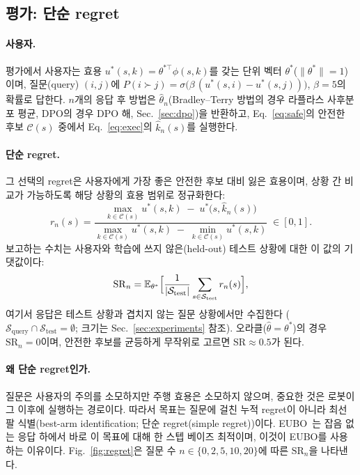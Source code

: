 \subsection{평가: 단순 regret}
\label{sec:regret}

\paragraph{사용자.}
평가에서 사용자는 효용 $u^\ast(s,k) = \theta^{\ast\top}\phi(s,k)$를 갖는 단위 벡터 $\theta^\ast$($\lVert\theta^\ast\rVert = 1$)이며,
질문(query) $(i,j)$에 $P(i \succ j) = \sigma\bigl(\beta\,(u^\ast(s,i) - u^\ast(s,j))\bigr)$, $\beta = 5$의 확률로 답한다.
$n$개의 응답 후 방법은 $\hat\theta_n$(Bradley--Terry 방법의 경우 라플라스 사후분포 평균, DPO의 경우 DPO 해,
Sec.~\ref{sec:dpo})을 반환하고, Eq.~\eqref{eq:safe}의 안전한 후보 $\mathcal{C}(s)$ 중에서 Eq.~\eqref{eq:exec}의 $\hat k_n(s)$를 실행한다.

\paragraph{단순 regret.}
그 선택의 regret은 사용자에게 가장 좋은 안전한 후보 대비 잃은 효용이며,
상황 간 비교가 가능하도록 해당 상황의 효용 범위로 정규화한다:
\begin{equation}
  r_n(s) = \frac{\max_{k \in \mathcal{C}(s)} u^\ast(s,k) \;-\; u^\ast\bigl(s,\hat k_n(s)\bigr)}
                {\max_{k \in \mathcal{C}(s)} u^\ast(s,k) \;-\; \min_{k \in \mathcal{C}(s)} u^\ast(s,k)}
  \;\in [0,1].
  \label{eq:regret}
\end{equation}
보고하는 수치는 사용자와 학습에 쓰지 않은(held-out) 테스트 상황에 대한 이 값의 기댓값이다:
\begin{equation}
  \mathrm{SR}_n = \mathbb{E}_{\theta^\ast}\Bigl[\frac{1}{|\mathcal{S}_{\text{test}}|}
  \sum_{s \in \mathcal{S}_{\text{test}}} r_n(s)\Bigr],
  \label{eq:sr}
\end{equation}
여기서 응답은 테스트 상황과 겹치지 않는 질문 상황에서만 수집한다
($\mathcal{S}_{\text{query}} \cap \mathcal{S}_{\text{test}} = \emptyset$; 크기는 Sec.~\ref{sec:experiments} 참조).
오라클($\hat\theta = \theta^\ast$)의 경우 $\mathrm{SR}_n = 0$이며,
안전한 후보를 균등하게 무작위로 고르면 $\mathrm{SR} \approx 0.5$가 된다.

\paragraph{왜 단순 regret인가.}
질문은 사용자의 주의를 소모하지만 주행 효용은 소모하지 않으며, 중요한 것은 로봇이 그 이후에
실행하는 경로이다. 따라서 목표는 질문에 걸친 누적 regret이 아니라 최선 팔 식별(best-arm identification; 단순 regret(simple regret))이다.
EUBO~\citep{astudillo2023qeubo}는 잡음 없는 응답 하에서 바로 이 목표에 대해 한 스텝 베이즈 최적이며,
이것이 EUBO를 사용하는 이유이다.
Fig.~\ref{fig:regret}은 질문 수 $n \in \{0,2,5,10,20\}$에 따른 $\mathrm{SR}_n$을 나타낸다.

